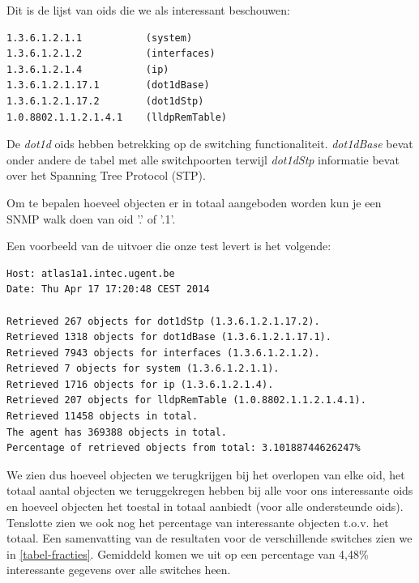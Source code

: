 Dit is de lijst van \glspl{oid} die we als interessant beschouwen:

\begin{lstlisting}
1.3.6.1.2.1.1			(system)
1.3.6.1.2.1.2			(interfaces)
1.3.6.1.2.1.4			(ip)
1.3.6.1.2.1.17.1 		(dot1dBase)
1.3.6.1.2.1.17.2		(dot1dStp)
1.0.8802.1.1.2.1.4.1	(lldpRemTable)
\end{lstlisting}

De \textit{dot1d} \glspl{oid} hebben betrekking op de switching functionaliteit.
\textit{dot1dBase} bevat onder andere de tabel met alle switchpoorten terwijl \textit{dot1dStp} informatie bevat over het Spanning Tree Protocol (STP).

Om te bepalen hoeveel objecten er in totaal aangeboden worden kun je een SNMP walk doen van \gls{oid} '.' of '.1'.

Een voorbeeld van de uitvoer die onze test levert is het volgende:

\begin{lstlisting}
Host: atlas1a1.intec.ugent.be
Date: Thu Apr 17 17:20:48 CEST 2014

Retrieved 267 objects for dot1dStp (1.3.6.1.2.1.17.2).
Retrieved 1318 objects for dot1dBase (1.3.6.1.2.1.17.1).
Retrieved 7943 objects for interfaces (1.3.6.1.2.1.2).
Retrieved 7 objects for system (1.3.6.1.2.1.1).
Retrieved 1716 objects for ip (1.3.6.1.2.1.4).
Retrieved 207 objects for lldpRemTable (1.0.8802.1.1.2.1.4.1).
Retrieved 11458 objects in total.
The agent has 369388 objects in total.
Percentage of retrieved objects from total: 3.10188744626247%
\end{lstlisting}

We zien dus hoeveel objecten we terugkrijgen bij het overlopen van elke \gls{oid},
het totaal aantal objecten we teruggekregen hebben bij alle voor ons interessante \glspl{oid} en
hoeveel objecten het toestal in totaal aanbiedt (voor alle ondersteunde \glspl{oid}).
Tenslotte zien we ook nog het percentage van interessante objecten t.o.v. het totaal.
Een samenvatting van de resultaten voor de verschillende switches zien we in \cref{tabel-fracties}.
Gemiddeld komen we uit op een percentage van 4,48\% interessante gegevens over alle switches heen.

